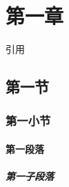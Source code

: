 \section{第一章}
    引用\cite{BRML}

\subsection{第一节}
\subsubsection{第一小节}
\paragraph{第一段落}
\subparagraph{第一子段落}